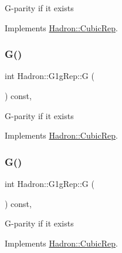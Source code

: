 G-\/parity if it exists 

Implements \mbox{\hyperlink{structHadron_1_1CubicRep_a52104e43266d1614c00bbd1c3b395458}{Hadron\+::\+Cubic\+Rep}}.

\mbox{\label{structHadron_1_1G1gRep_aa9607b9bc9fbe4949b3b20273e93add9}} 
\subsubsection{\texorpdfstring{G()}{G()}\hspace{0.1cm}{\footnotesize\ttfamily [2/3]}}
{\footnotesize\ttfamily int Hadron\+::\+G1g\+Rep\+::G (\begin{DoxyParamCaption}{ }\end{DoxyParamCaption}) const\hspace{0.3cm}{\ttfamily [inline]}, {\ttfamily [virtual]}}

G-\/parity if it exists 

Implements \mbox{\hyperlink{structHadron_1_1CubicRep_a52104e43266d1614c00bbd1c3b395458}{Hadron\+::\+Cubic\+Rep}}.

\mbox{\label{structHadron_1_1G1gRep_aa9607b9bc9fbe4949b3b20273e93add9}} 
\subsubsection{\texorpdfstring{G()}{G()}\hspace{0.1cm}{\footnotesize\ttfamily [3/3]}}
{\footnotesize\ttfamily int Hadron\+::\+G1g\+Rep\+::G (\begin{DoxyParamCaption}{ }\end{DoxyParamCaption}) const\hspace{0.3cm}{\ttfamily [inline]}, {\ttfamily [virtual]}}

G-\/parity if it exists 

Implements \mbox{\hyperlink{structHadron_1_1CubicRep_a52104e43266d1614c00bbd1c3b395458}{Hadron\+::\+Cubic\+Rep}}.

\mbox{\label{structHadron_1_1G1gRep_a9cac45eca83a4b934646e99a068bec72}} 
